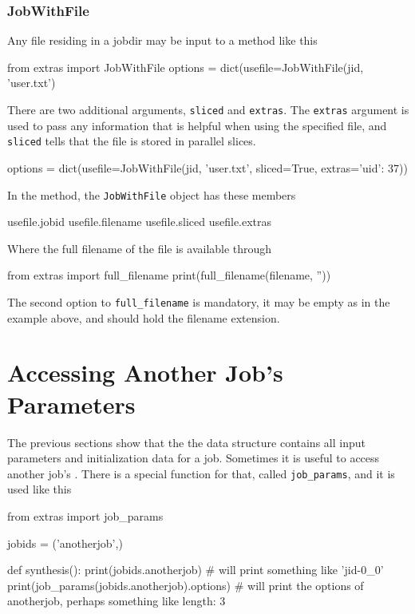 \subsubsection*{JobWithFile}
Any file residing in a jobdir may be input to a method like this
\begin{python}
from extras import JobWithFile
options = dict(usefile=JobWithFile(jid, 'user.txt')
\end{python}
There are two additional arguments, \texttt{sliced} and
\texttt{extras}.  The \texttt{extras} argument is used to pass any
information that is helpful when using the specified file, and
\texttt{sliced} tells that the file is stored in parallel slices.
\begin{python}
options = dict(usefile=JobWithFile(jid, 'user.txt', sliced=True, extras={'uid': 37}))
\end{python}
In the method, the \texttt{JobWithFile} object has these members
\begin{python}
usefile.jobid
usefile.filename
usefile.sliced
usefile.extras
\end{python}
Where the full filename of the file is available through
\begin{python}
from extras import full_filename
print(full_filename(filename, ''))
\end{python}
The second option to \texttt{full\_filename} is mandatory, it may be
empty as in the example above, and should hold the filename extension.



\section{Accessing Another Job's Parameters}

The previous sections show that the the \params data structure
contains all input parameters and initialization data for a job.
Sometimes it is useful to access another job's \params.  There is a
special function for that, called \texttt{job\_params}, and it is used
like this
\begin{python}
from extras import job_params

jobids = ('anotherjob',)

def synthesis():
    print(jobids.anotherjob)
    # will print something like 'jid-0_0'
    print(job_params(jobids.anotherjob).options)
    # will print the options of anotherjob, perhaps something like {length: 3}
\end{python}

